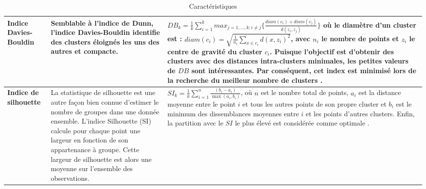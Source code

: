 \begin{table}[H]
\begin{tabular}{|m{2cm}|m{5cm}|m{12cm}|}
	\textbf{Indice Davies-Bouldin} & Semblable à l'indice de Dunn, l'indice Davies-Bouldin \cite{davies1979cluster} identifie des clusters éloignés les uns des autres et compacte.  & \(\displaystyle DB_{k} = \frac{1}{k} \sum_{i=1}^{k} max_{j=1,...,k;i \neq j} \Bigg \{ \frac{diam(c_{i}) + diam(c_{j})}{d(z_{i},z_{j})} \Bigg \}  \) \newline où le diamètre d'un cluster est : \(\displaystyle diam(c_{i}) = \sqrt{\frac{1}{n_{i}} \sum_{x \in c_{i}} d(x,z_{i})^{2}}  \), avec \(\displaystyle n_{i}  \) le nombre de points et \(\displaystyle z_{i}  \) le centre de gravité du cluster \(\displaystyle c_{i}  \). Puisque l'objectif est d'obtenir des clusters avec des distances intra-clusters minimales, les petites valeurs de \(\displaystyle DB  \) sont intéressantes. Par conséquent, cet index est minimisé lors de la recherche du meilleur nombre de clusters \cite{Saitta2008}. \\ \hline
	\textbf{Indice de silhouette} & La statistique de silhouette \cite{kaufman2009finding} est une autre façon bien connue d'estimer le nombre de groupes dans une donnée ensemble. L'indice Silhouette (SI) calcule pour chaque point une largeur en fonction de son appartenance à groupe. Cette largeur de silhouette est alors une moyenne sur l'ensemble des observations.  & \(\displaystyle SI_{k} = \frac{1}{k} \sum_{i=1}^{n} \frac{(b_{i} - a_{i})}{\max (a_{i},b_{i})}  \), \newline où \(\displaystyle n  \) est le nombre total de points, \(\displaystyle a_{i}  \) est la distance moyenne entre le point \(\displaystyle i  \) et tous les autres points de son propre cluster et \(\displaystyle b_{i}  \) est le minimum des dissemblances moyennes entre \(\displaystyle i  \) et les points d'autres clusters. Enfin, la partition avec le \(\displaystyle SI  \) le plus élevé est considérée comme optimale \cite{Saitta2008}. \\ \hline
	\end{tabular}
	\caption{Caractéristiques }
	\label{Caracteristiques }
\end{table}


